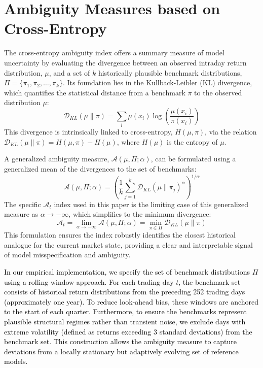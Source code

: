\documentclass[preprint,12pt,authoryear]{elsarticle}
\begin{document}
\section{Ambiguity Measures based on Cross-Entropy}
The cross-entropy ambiguity index offers a summary measure of model uncertainty by evaluating the divergence between an observed intraday return distribution, $\mu$, and a set of $k$ historically plausible benchmark distributions, $\Pi = \{\pi_1, \pi_2, \dots, \pi_k\}$. Its foundation lies in the Kullback-Leibler (KL) divergence, which quantifies the statistical distance from a benchmark $\pi$ to the observed distribution $\mu$:
\begin{equation}
    \mathcal{D}_{KL}(\mu \| \pi) = \sum_{i} \mu(x_i) \log\left(\frac{\mu(x_i)}{\pi(x_i)}\right)
\end{equation}
This divergence is intrinsically linked to cross-entropy, $H(\mu, \pi)$, via the relation $\mathcal{D}_{KL}(\mu \| \pi) = H(\mu, \pi) - H(\mu)$, where $H(\mu)$ is the entropy of $\mu$.

A generalized ambiguity measure, $\mathcal{A}(\mu, \Pi; \alpha)$, can be formulated using a generalized mean of the divergences to the set of benchmarks:
\begin{equation}
    \mathcal{A}(\mu, \Pi; \alpha) = \left( \frac{1}{k} \sum_{j=1}^{k} \mathcal{D}_{KL}(\mu \| \pi_j)^{\alpha} \right)^{1/\alpha}
\end{equation}
The specific $\mathcal{A}_t$ index used in this paper is the limiting case of this generalized measure as $\alpha \to -\infty$, which simplifies to the minimum divergence:
\begin{equation}
    \mathcal{A}_t = \lim_{\alpha \to -\infty} \mathcal{A}(\mu, \Pi; \alpha) = \min_{\pi \in \Pi} \mathcal{D}_{KL}(\mu \| \pi)
\end{equation}
This formulation ensures the index robustly identifies the closest historical analogue for the current market state, providing a clear and interpretable signal of model misspecification and ambiguity.

\textcolor{black}{In our empirical implementation, we specify the set of benchmark distributions $\Pi$ using a rolling window approach. For each trading day $t$, the benchmark set consists of historical return distributions from the preceding 252 trading days (approximately one year). To reduce look-ahead bias, these windows are anchored to the start of each quarter. Furthermore, to ensure the benchmarks represent plausible structural regimes rather than transient noise, we exclude days with extreme volatility (defined as returns exceeding 3 standard deviations) from the benchmark set. This construction allows the ambiguity measure to capture deviations from a locally stationary but adaptively evolving set of reference models.}
\end{document}
